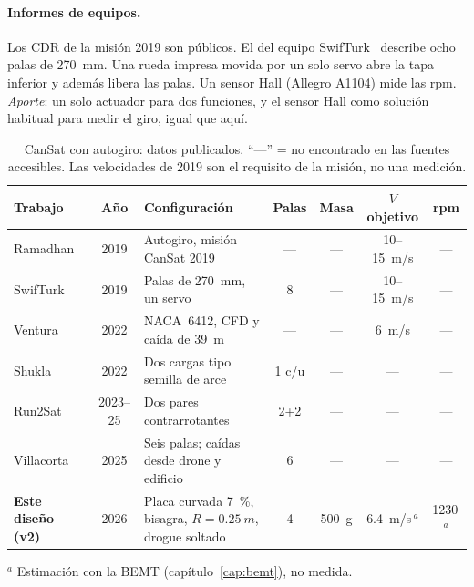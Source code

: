 \paragraph{Informes de equipos.} Los CDR de la misión 2019 son públicos. El del equipo
SwifTurk~\cite{literatura-swifturk2019} describe ocho palas de \SI{270}{mm}. Una rueda
impresa movida por un solo servo abre la tapa inferior y además libera las palas. Un
sensor Hall (Allegro A1104) mide las rpm. \emph{Aporte}: un solo actuador para dos
funciones, y el sensor Hall como solución habitual para medir el giro, igual que aquí.

\begin{table}[H]
\centering\footnotesize
\caption{CanSat con autogiro: datos publicados. ``---'' = no encontrado en las fuentes
accesibles. Las velocidades de 2019 son el requisito de la misión, no una medición.}
\label{tab:literatura-cansat}
\begin{tabularx}{\textwidth}{@{}l c Y c c c c@{}}
\toprule
\textbf{Trabajo} & \textbf{Año} & \textbf{Configuración} & \textbf{Palas} &
\textbf{Masa} & \textbf{$V$ objetivo} & \textbf{rpm}\\\midrule
Ramadhan~\cite{ramadhan2019} & 2019 & Autogiro, misión CanSat 2019 & --- & --- & 10--\SI{15}{m/s} & ---\\
SwifTurk~\cite{literatura-swifturk2019} & 2019 & Palas de \SI{270}{mm}, un servo & 8 & --- & 10--\SI{15}{m/s} & ---\\
Ventura~\cite{ventura2022} & 2022 & NACA~6412, CFD y caída de \SI{39}{m} & --- & --- & \SI{6}{m/s} & ---\\
Shukla~\cite{literatura-shukla2022} & 2022 & Dos cargas tipo semilla de arce & 1 c/u & --- & --- & ---\\
Run2Sat~\cite{literatura-rivadeneira2023,literatura-rivadeneira2025} & 2023--25 & Dos pares contrarrotantes & 2+2 & --- & --- & ---\\
Villacorta~\cite{literatura-villacorta2025} & 2025 & Seis palas; caídas desde drone y edificio & 6 & --- & --- & ---\\\midrule
\textbf{Este diseño (v2)} & 2026 & Placa curvada \SI{7}{\percent}, bisagra, $R=\SI{0.25}{m}$, drogue soltado & 4 & \SI{500}{g} & \SI{6.4}{m/s}\,$^{a}$ & \num{1230}\,$^{a}$\\
\bottomrule
\end{tabularx}

\smallskip\raggedright\footnotesize $^{a}$ Estimación con la BEMT (capítulo~\ref{cap:bemt}), no medida.
\end{table}

